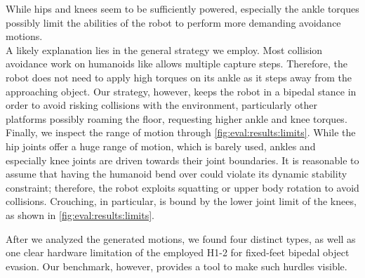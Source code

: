 While hips and knees seem to be sufficiently powered, especially the ankle torques possibly limit the abilities of the robot to perform more demanding avoidance motions.
\\
A likely explanation lies in the general strategy we employ.
Most collision avoidance work on humanoids like \cite{yang_2026,kohlbrenner_2026} allows multiple capture steps.
Therefore, the robot does not need to apply high torques on its ankle as it steps away from the approaching object.
Our strategy, however, keeps the robot in a bipedal stance in order to avoid risking collisions with the environment, particularly other platforms possibly roaming the floor, requesting higher ankle and knee torques.
\\
Finally, we inspect the range of motion through \cref{fig:eval:results:limits}.
While the hip joints offer a huge range of motion, which is barely used, ankles and especially knee joints are driven towards their joint boundaries.
It is reasonable to assume that having the humanoid bend over could violate its dynamic stability constraint; therefore, the robot exploits squatting or upper body rotation to avoid collisions.
Crouching, in particular, is bound by the lower joint limit of the knees, as shown in \cref{fig:eval:results:limits}. \par
After we analyzed the generated motions, we found four distinct types, as well as one clear hardware limitation of the employed H1-2 for fixed-feet bipedal object evasion.
Our benchmark, however, provides a tool to make such hurdles visible.

